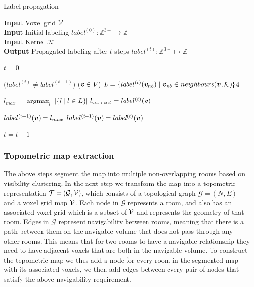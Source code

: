 \begin{algorithm}
    \caption{Label propagation}
    \hspace*{\algorithmicindent} \textbf{Input} Voxel grid \(\mathcal{V}\) \\
    \hspace*{\algorithmicindent} \textbf{Input} Initial labeling \(label^{(0)}: \mathbb{Z}^{3+} \mapsto \mathbb{Z}\) \\
    \hspace*{\algorithmicindent} \textbf{Input}  Kernel \(\mathcal{K}\) \\
    \hspace*{\algorithmicindent} \textbf{Output} Propagated labeling after \(t\) steps \(label^{(t)}: \mathbb{Z}^{3+} \mapsto \mathbb{Z}\) \\

    \begin{algorithmic}

    \State $t=0$

    \While($label^{(t)} \neq label^{(t+1)}$) 
        \ForEach($\boldsymbol{v} \in \mathcal{V}$)
            \State $L = \{label^{(t)}(\boldsymbol{v}_{nb}) \mid \boldsymbol{v}_{nb} \in neighbours(\boldsymbol{v}, \mathcal{K})\}$4

            \State $l_{max} = \mathop{argmax}_{l} \ |\{l \mid l \in L\}|$ 
            \State $l_{current} = label^{(t)}(\boldsymbol{v})$  

                \State \(label^{(t+1)}(\boldsymbol{v}) = l_{max}\)
            \Else
                \State \(label^{(t+1)}(\boldsymbol{v}) = label^{(t)}(\boldsymbol{v})\)
            \EndIf
        \EndFor

        \State $t = t+1$ 
    \EndWhile
    \end{algorithmic}
\end{algorithm}

\subsubsection{Topometric map extraction}
The above steps segment the map into multiple non-overlapping rooms based on visibility clustering. In the next step we transform the map into a topometric representation \(\mathcal{T} = (\mathcal{G}, \mathcal{V})\), which consists of a topological graph \(\mathcal{G}=(N,E)\) and a voxel grid map \(\mathcal{V}\). Each node in \(\mathcal{G}\) represents a room, and also has an associated voxel grid which is a subset of \(\mathcal{V}\) and represents the geometry of that room. Edges in \(\mathcal{G}\) represent navigability between rooms, meaning that there is a path between them on the navigable volume that does not pass through any other rooms. This means that for two rooms to have a navigable relationship they need to have adjacent voxels that are both in the navigable volume. To construct the topometric map we thus add a node for every room in the segmented map with its associated voxels, we then add edges between every pair of nodes that satisfy the above navigability requirement.  



